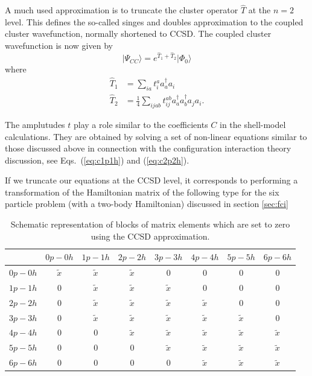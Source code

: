A much used approximation is to truncate the cluster operator
$\hat{T}$ at the $n=2$ level. This defines the so-called singes and
doubles approximation to the coupled cluster wavefunction, normally
shortened to CCSD.
The coupled cluster wavefunction is now given by
  \begin{equation}
              \vert \Psi_{CC}\rangle = e^{\hat{T}_1 + \hat{T}_2} \vert
              \Phi_0\rangle
  \end{equation}
  where
          \begin{align*}
              \hat{T}_1 &= \sum_{ia} t_{i}^{a} a_{a}^\dagger a_i
              \\ \hat{T}_2 &= \frac{1}{4} \sum_{ijab} t_{ij}^{ab}
              a_{a}^\dagger a_{b}^\dagger a_{j} a_{i}.
          \end{align*}

  The amplutudes $t$ play a role similar to the coefficients $C$ in
  the shell-model calculations. They are obtained by solving a set of
  non-linear equations similar to those discussed above in connection
  with the configuration interaction theory  discussion, see Eqs.~(\ref{eq:c1p1h}) and (\ref{eq:c2p2h}). 

  If we truncate our equations at the CCSD level, it corresponds to
  performing a transformation of the Hamiltonian matrix of the
  following type for the six particle problem (with a two-body
  Hamiltonian) discussed in section \ref{sec:fci}
  \begin{table}
\caption{Schematic representation of blocks of matrix elements which are set to zero using the CCSD approximation.}
  \begin{center}
  \begin{tabular}{cccccccc}
  \hline \multicolumn{1}{c}{ } & \multicolumn{1}{c}{ $0p-0h$ } &
  \multicolumn{1}{c}{ $1p-1h$ } & \multicolumn{1}{c}{ $2p-2h$ } &
  \multicolumn{1}{c}{ $3p-3h$ } & \multicolumn{1}{c}{ $4p-4h$ } &
  \multicolumn{1}{c}{ $5p-5h$ } & \multicolumn{1}{c}{ $6p-6h$ }
  \\ \hline $0p-0h$ & $\tilde{x}$ & $\tilde{x}$ & $\tilde{x}$ & 0 & 0
  & 0 & 0 \\ $1p-1h$ & 0 & $\tilde{x}$ & $\tilde{x}$ & $\tilde{x}$ & 0
  & 0 & 0 \\ $2p-2h$ & 0 & $\tilde{x}$ & $\tilde{x}$ & $\tilde{x}$ &
  $\tilde{x}$ & 0 & 0 \\ $3p-3h$ & 0 & $\tilde{x}$ & $\tilde{x}$ &
  $\tilde{x}$ & $\tilde{x}$ & $\tilde{x}$ & 0 \\ $4p-4h$ & 0 & 0 &
  $\tilde{x}$ & $\tilde{x}$ & $\tilde{x}$ & $\tilde{x}$ & $\tilde{x}$
  \\ $5p-5h$ & 0 & 0 & 0 & $\tilde{x}$ & $\tilde{x}$ & $\tilde{x}$ &
  $\tilde{x}$ \\ $6p-6h$ & 0 & 0 & 0 & 0 & $\tilde{x}$ & $\tilde{x}$ &
  $\tilde{x}$ \\ \hline
  \end{tabular}
  \end{center}
  \end{table}

